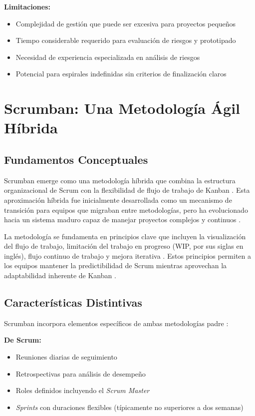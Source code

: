 \documentclass[conference]{IEEEtran}
\begin{document}
\textbf{Limitaciones:}
\begin{itemize}
\item Complejidad de gestión que puede ser excesiva para proyectos pequeños \cite{geeksforgeeks_spiral}
\item Tiempo considerable requerido para evaluación de riesgos y prototipado \cite{gordon_case_study}
\item Necesidad de experiencia especializada en análisis de riesgos \cite{nelson_small_project}
\item Potencial para espirales indefinidas sin criterios de finalización claros \cite{ultimate_sdlc_spiral}
\end{itemize}

\section{Scrumban: Una Metodología Ágil Híbrida}

\subsection{Fundamentos Conceptuales}

Scrumban emerge como una metodología híbrida que combina la estructura organizacional de Scrum con la flexibilidad de flujo de trabajo de Kanban \cite{atlassian_scrumban}. Esta aproximación híbrida fue inicialmente desarrollada como un mecanismo de transición para equipos que migraban entre metodologías, pero ha evolucionado hacia un sistema maduro capaz de manejar proyectos complejos y continuos \cite{atlassian_scrumban}.

La metodología se fundamenta en principios clave que incluyen la visualización del flujo de trabajo, limitación del trabajo en progreso (WIP, por sus siglas en inglés), flujo continuo de trabajo y mejora iterativa \cite{sixsigma_scrumban}. Estos principios permiten a los equipos mantener la predictibilidad de Scrum mientras aprovechan la adaptabilidad inherente de Kanban \cite{empirical_scrumban_2018}.

\subsection{Características Distintivas}

Scrumban incorpora elementos específicos de ambas metodologías padre \cite{comparison_agile_2016}:

\textbf{De Scrum:}
\begin{itemize}
\item Reuniones diarias de seguimiento
\item Retrospectivas para análisis de desempeño
\item Roles definidos incluyendo el \textit{Scrum Master}
\item \textit{Sprints} con duraciones flexibles (típicamente no superiores a dos semanas) \cite{comparison_agile_2016}
\end{itemize}
\end{document}
